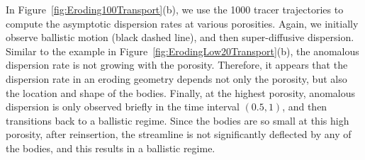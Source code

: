 \documentclass[preprint,10pt]{elsarticle}
\begin{document}
In Figure~\ref{fig:Eroding100Transport}(b), we use the 1000 tracer
trajectories to compute the asymptotic dispersion rates at various
porosities.  Again, we initially observe ballistic motion (black dashed
line), and then super-diffusive dispersion.  Similar to the example in
Figure~\ref{fig:ErodingLow20Transport}(b), the anomalous dispersion rate
is not growing with the porosity.  Therefore, it appears that the
dispersion rate in an eroding geometry depends not only the porosity,
but also the location and shape of the bodies.  Finally, at the highest
porosity, anomalous dispersion is only observed briefly in the time
interval $(0.5,1)$, and then transitions back to a ballistic regime.
Since the bodies are so small at this high porosity, after reinsertion,
the streamline is not significantly deflected by any of the bodies, and
this results in a ballistic regime.
\end{document}

